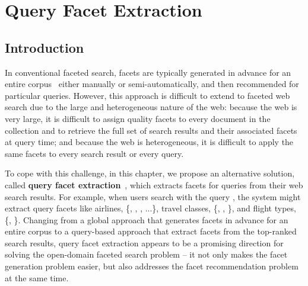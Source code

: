 \chapter{Query Facet Extraction}
\label{ch:facet}
\section{Introduction}
In conventional faceted search, facets are typically generated in advance for an entire corpus~\cite{stoica2007automating,dakka2008automatic} either manually or semi-automatically, and then recommended for particular queries. However, this approach is difficult to extend to faceted web search due to the large and heterogeneous nature of the web: because the web is very large, it is
difficult to assign quality facets to every document in the collection and to retrieve the full set of search results and their associated facets at query time; and because the web is heterogeneous, it is difficult to apply the same facets to every search result or every query.

To cope with this challenge, in this chapter, we propose an alternative solution, called \textbf{query facet extraction}~\cite{kong2013extracting}, which extracts facets for queries from their web search results. For example, when users search with the query , the system might extract query facets like airlines, \{, , , ...\}, travel classes, \{, , \}, and flight types, \{, \}. Changing from a global approach that generates facets in advance for an entire corpus to a query-based approach that extract facets from the top-ranked search results, query facet extraction appears to be a promising direction for solving the open-domain faceted search problem -- it not only makes the facet generation problem easier, but also addresses the facet recommendation problem at the same time.


